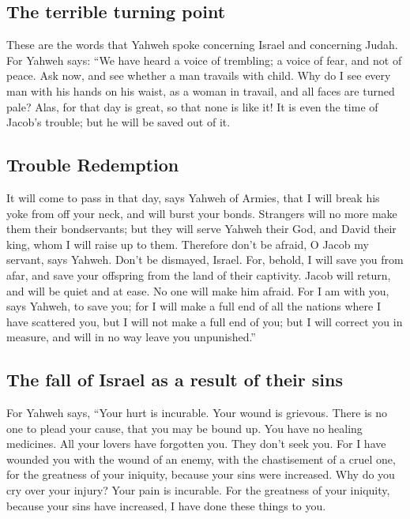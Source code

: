 \hypertarget{the-terrible-turning-point}{%
\subsection{The terrible turning
point}\label{the-terrible-turning-point}}

 These are the words that Yahweh spoke concerning Israel
and concerning Judah.  For Yahweh says: ``We have heard a
voice of trembling; a voice of fear, and not of peace. 
Ask now, and see whether a man travails with child. Why do I see every
man with his hands on his waist, as a woman in travail, and all faces
are turned pale?  Alas, for that day is great, so that
none is like it! It is even the time of Jacob's trouble; but he will be
saved out of it.

\hypertarget{trouble-redemption}{%
\subsection{Trouble Redemption}\label{trouble-redemption}}

 It will come to pass in that day, says Yahweh of Armies,
that I will break his yoke from off your neck, and will burst your
bonds. Strangers will no more make them their bondservants;
 but they will serve Yahweh their God, and David their
king, whom I will raise up to them.  Therefore don't be
afraid, O Jacob my servant, says Yahweh. Don't be dismayed, Israel. For,
behold, I will save you from afar, and save your offspring from the land
of their captivity. Jacob will return, and will be quiet and at ease. No
one will make him afraid.  For I am with you, says
Yahweh, to save you; for I will make a full end of all the nations where
I have scattered you, but I will not make a full end of you; but I will
correct you in measure, and will in no way leave you unpunished.''

\hypertarget{the-fall-of-israel-as-a-result-of-their-sins}{%
\subsection{The fall of Israel as a result of their
sins}\label{the-fall-of-israel-as-a-result-of-their-sins}}

 For Yahweh says, ``Your hurt is incurable. Your wound is
grievous.  There is no one to plead your cause, that you
may be bound up. You have no healing medicines.  All your
lovers have forgotten you. They don't seek you. For I have wounded you
with the wound of an enemy, with the chastisement of a cruel one, for
the greatness of your iniquity, because your sins were increased.
 Why do you cry over your injury? Your pain is incurable.
For the greatness of your iniquity, because your sins have increased, I
have done these things to you.


